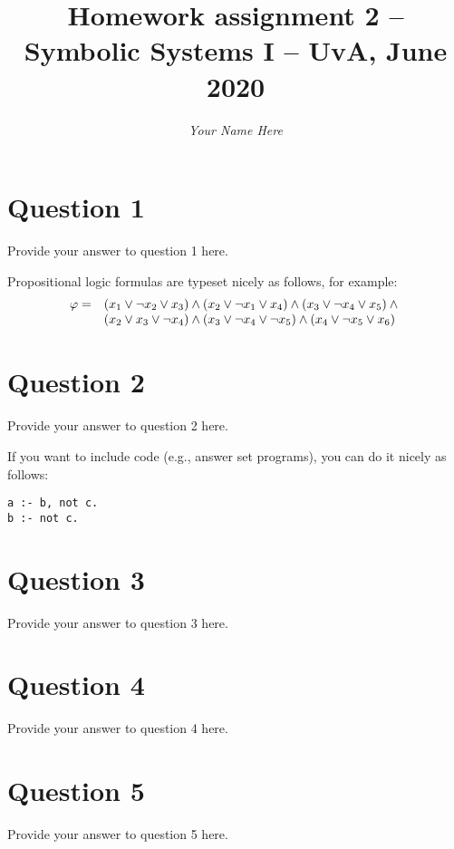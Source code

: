 \documentclass[10pt,a4paper]{article}
\title{Homework assignment 2 -- Symbolic Systems I -- UvA, June 2020}
\author{\it Your Name Here}
\date{}
\begin{document}
\maketitle

\section*{Question 1}

Provide your answer to question 1 here.

Propositional logic formulas are typeset nicely as follows, for example:
\[ \begin{array}{r l}
  \varphi = &
    (x_1 \vee \neg x_2 \vee x_3)
    \wedge
    (x_2 \vee \neg x_1 \vee x_4)
    \wedge
    (x_3 \vee \neg x_4 \vee x_5)
    \wedge {} \\
  & (x_2 \vee x_3 \vee \neg x_4)
    \wedge
    (x_3 \vee \neg x_4 \vee \neg x_5)
    \wedge
    (x_4 \vee \neg x_5 \vee x_6) \\
\end{array} \]

\section*{Question 2}

Provide your answer to question 2 here.

If you want to include code (e.g., answer set programs), you can do it nicely as follows:

\begin{lstlisting}
a :- b, not c.
b :- not c.
\end{lstlisting}

\section*{Question 3}

Provide your answer to question 3 here.

\section*{Question 4}

Provide your answer to question 4 here.

\section*{Question 5}

Provide your answer to question 5 here.
\end{document}

